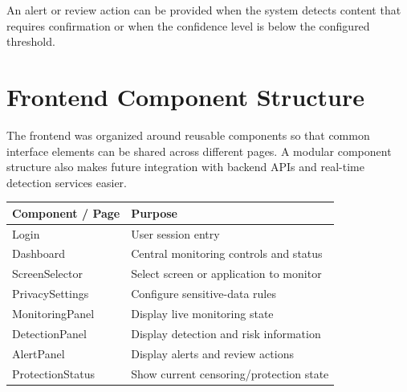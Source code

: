 \documentclass[12pt,a4paper]{article}
\begin{document}
An alert or review action can be provided when the system detects content that requires
confirmation or when the confidence level is below the configured threshold.


\section{Frontend Component Structure}

The frontend was organized around reusable components so that common interface
elements can be shared across different pages. A modular component structure also
makes future integration with backend APIs and real-time detection services easier.

\vspace{2pt}

\begin{center}
\renewcommand{\arraystretch}{1.15}

\begin{tabular}{|p{5.8cm}|p{10.4cm}|}
\hline

\textbf{Component / Page} & \textbf{Purpose}
\\
\hline

Login & User session entry
\\
\hline

Dashboard & Central monitoring controls and status
\\
\hline

ScreenSelector & Select screen or application to monitor
\\
\hline

PrivacySettings & Configure sensitive-data rules
\\
\hline

MonitoringPanel & Display live monitoring state
\\
\hline

DetectionPanel & Display detection and risk information
\\
\hline

AlertPanel & Display alerts and review actions
\\
\hline

ProtectionStatus & Show current censoring/protection state
\\
\hline

\end{tabular}
\end{center}
\end{document}
